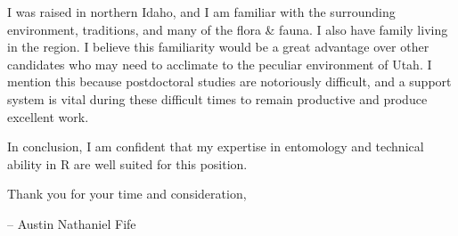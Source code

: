 \documentclass[11pt]{letter} %
\begin{document}
\begin{letter}
I was raised in northern Idaho, and I am familiar with the surrounding environment, traditions, and many of the flora \& fauna. I also have family living in the region. I believe this familiarity would be a great advantage over other candidates who may need to acclimate to the peculiar environment of Utah. I mention this because postdoctoral studies are notoriously difficult, and a support system is vital during these difficult times to remain productive and produce excellent work. 

In conclusion, I am confident that my expertise in entomology and technical ability in R are well suited for this position.

Thank you for your time and consideration,

\quad -- Austin Nathaniel Fife

\thispagestyle{empty}

\end{letter}
\end{document}
